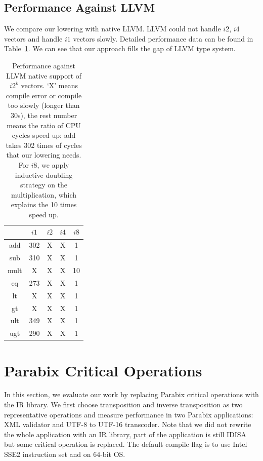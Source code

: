 \subsection{Performance Against LLVM}
We compare our lowering with native LLVM\@. LLVM could not handle $i2$, $i4$ vectors and handle $i1$ vectors slowly. Detailed performance data can be found in Table~\ref{table:vector_perf_LLVM}. We can see that our approach fills the gap of LLVM type system.

\begin{table}[h]
\centering
\begin{tabular}{|c|c|c|c|c|}
\hline
     & $i1$ & $i2$ & $i4$ & $i8$ \\ \hline
add  & 302  & X    & X    & 1\\ \hline
sub  & 310  & X    & X    & 1\\ \hline
mult & X    & X    & X    & 10\\ \hline
eq   & 273  & X    & X    & 1\\ \hline
lt   & X    & X    & X    & 1\\ \hline
gt   & X    & X    & X    & 1\\ \hline
ult  & 349  & X    & X    & 1\\ \hline
ugt  & 290  & X    & X    & 1\\ \hline
\end{tabular}
\caption[Performance against LLVM native support for $i2^k$ vectors]{Performance against LLVM native support of $i2^k$ vectors. `X' means compile error or compile too slowly (longer than 30s), the rest number means the ratio of CPU cycles speed up: add takes 302 times of cycles that our lowering needs. For $i8$, we apply inductive doubling strategy on the multiplication, which explains the 10 times speed up. }
\label{table:vector_perf_LLVM}
\end{table}

\section{Parabix Critical Operations}
In this section, we evaluate our work by replacing Parabix critical operations with the IR library. We first choose transposition and inverse transposition as two representative operations and measure performance in two Parabix applications: XML validator and UTF-8 to UTF-16 transcoder. Note that we did not rewrite the whole application with an IR library, part of the application is still IDISA but some critical operation is replaced. The default compile flag is to use Intel SSE2 instruction set and on 64-bit OS.


